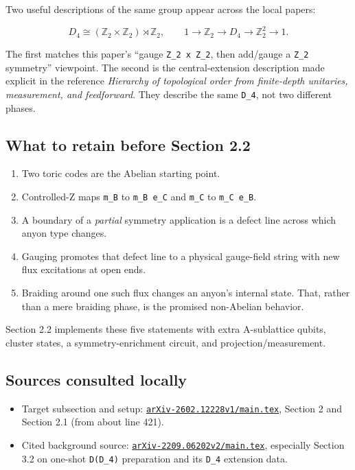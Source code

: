 \documentclass[
]{article}
\providecommand{\tightlist}{%
  \setlength{\itemsep}{0pt}\setlength{\parskip}{0pt}}
\begin{document}
Two useful descriptions of the same group appear across the local
papers:

\[
D_4 \cong (\mathbb Z_2\times\mathbb Z_2)\rtimes\mathbb Z_2,
\qquad
1\to\mathbb Z_2\to D_4\to\mathbb Z_2^2\to1.
\]

The first matches this paper's ``gauge \texttt{Z\_2\ x\ Z\_2}, then
add/gauge a \texttt{Z\_2} symmetry'' viewpoint. The second is the
central-extension description made explicit in the reference
\emph{Hierarchy of topological order from finite-depth unitaries,
measurement, and feedforward}. They describe the same \texttt{D\_4}, not
two different phases.

\subsection{What to retain before Section
2.2}\label{what-to-retain-before-section-2.2}

\begin{enumerate}
\def\labelenumi{\arabic{enumi}.}
\tightlist
\item
  Two toric codes are the Abelian starting point.
\item
  Controlled-Z maps \texttt{m\_B} to \texttt{m\_B\ e\_C} and
  \texttt{m\_C} to \texttt{m\_C\ e\_B}.
\item
  A boundary of a \emph{partial} symmetry application is a defect line
  across which anyon type changes.
\item
  Gauging promotes that defect line to a physical gauge-field string
  with new flux excitations at open ends.
\item
  Braiding around one such flux changes an anyon's internal state. That,
  rather than a mere braiding phase, is the promised non-Abelian
  behavior.
\end{enumerate}

Section 2.2 implements these five statements with extra A-sublattice
qubits, cluster states, a symmetry-enrichment circuit, and
projection/measurement.

\subsection{Sources consulted locally}\label{sources-consulted-locally}

\begin{itemize}
\tightlist
\item
  Target subsection and setup:
  \href{../arXiv-2602.12228v1/main.tex}{\texttt{arXiv-2602.12228v1/main.tex}},
  Section 2 and Section 2.1 (from about line 421).
\item
  Cited background source:
  \href{../arXiv-2209.06202v2/main.tex}{\texttt{arXiv-2209.06202v2/main.tex}},
  especially Section 3.2 on one-shot \texttt{D(D\_4)} preparation and
  its \texttt{D\_4} extension data.
\end{itemize}
\end{document}
